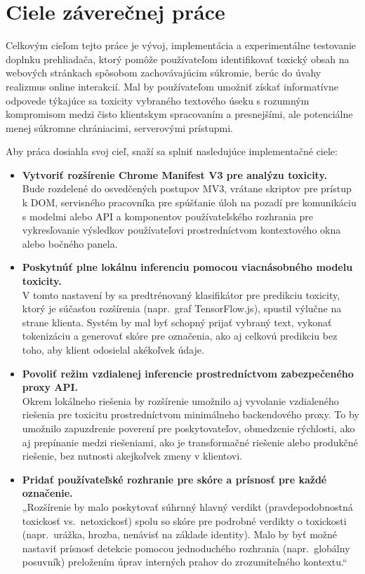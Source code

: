 \chapter{Ciele záverečnej práce}
Celkovým cieľom tejto práce je vývoj, implementácia a experimentálne testovanie doplnku prehliadača, ktorý pomôže používateľom identifikovať toxický obsah na webových stránkach spôsobom zachovávajúcim súkromie, berúc do úvahy realizmus online interakcií. Mal by používateľom umožniť získať informatívne odpovede týkajúce sa toxicity vybraného textového úseku s rozumným kompromisom medzi čisto klientskym spracovaním a presnejšími, ale potenciálne menej súkromne chrániacimi, serverovými prístupmi.

Aby práca dosiahla svoj cieľ, snaží sa splniť nasledujúce implementačné ciele:
\begin{itemize}
  \item \textbf{Vytvoriť rozšírenie Chrome Manifest V3 pre analýzu toxicity.}\\
  Bude rozdelené do osvedčených postupov MV3, vrátane skriptov pre prístup k DOM, servisného pracovníka pre spúšťanie úloh na pozadí pre komunikáciu s modelmi alebo API a komponentov používateľského rozhrania pre vykresľovanie výsledkov používateľovi prostredníctvom kontextového okna alebo bočného panela.
  \item \textbf{Poskytnúť plne lokálnu inferenciu pomocou viacnásobného modelu toxicity.}\\
  V tomto nastavení by sa predtrénovaný klasifikátor pre predikciu toxicity, ktorý je súčasťou rozšírenia (napr.\ graf TensorFlow.js), spustil výlučne na strane klienta. Systém by mal byť schopný prijať vybraný text, vykonať tokenizáciu a generovať skóre pre označenia, ako aj celkovú predikciu bez toho, aby klient odosielal akékoľvek údaje.
  \item \textbf{Povoliť režim vzdialenej inferencie prostredníctvom zabezpečeného proxy API.}\\
  Okrem lokálneho riešenia by rozšírenie umožnilo aj vyvolanie vzdialeného riešenia pre toxicitu prostredníctvom minimálneho backendového proxy. To by umožnilo zapuzdrenie poverení pre poskytovateľov, obmedzenie rýchlosti, ako aj prepínanie medzi riešeniami, ako je transformačné riešenie alebo produkčné riešenie, bez nutnosti akejkoľvek zmeny v klientovi.
  \item \textbf{Pridať používateľské rozhranie pre skóre a prísnosť pre každé označenie.}\\
  „Rozšírenie by malo poskytovať súhrnný hlavný verdikt (pravdepodobnostná toxickosť vs.\ netoxickosť) spolu so skóre pre podrobné verdikty o toxickosti (napr.\ urážka, hrozba, nenávisť na základe identity). Malo by byť možné nastaviť prísnosť detekcie pomocou jednoduchého rozhrania (napr.\ globálny posuvník) preložením úprav interných prahov do zrozumiteľného kontextu.“

\end{itemize}
